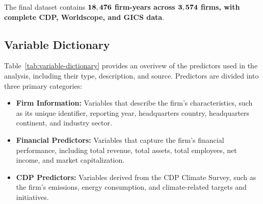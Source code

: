 \noindent The final dataset contains \textbf{$\bf{18,476}$ firm-years across $\bf{3,574}$ firms, with complete CDP, Worldscope, and GICS data}. 
\newpage




\subsection{Variable Dictionary}

\noindent Table~\ref{tab:variable-dictionary} provides an overivew of the predictors used in the analysis, including their type, description, and source. Predictors are divided into three primary categories: \begin{itemize}
    \item \textbf{Firm Information:} Variables that describe the firm's characteristics, such as its unique identifier, reporting year, headquarters country, headquarters continent, and industry sector.
    \item \textbf{Financial Predictors:} Variables that capture the firm's financial performance, including total revenue, total assets, total employees, net income, and market capitalization.
    \item \textbf{CDP Predictors:} Variables derived from the CDP Climate Survey, such as the firm's emissions, energy consumption, and climate-related targets and initiatives.
\end{itemize}
